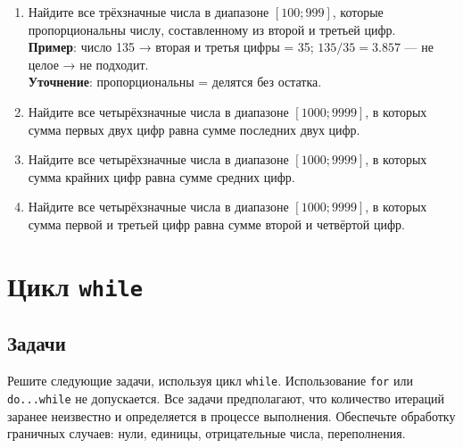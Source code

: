 \documentclass[12pt]{article}
\begin{document}
\begin{enumerate}
    \item Найдите все трёхзначные числа в диапазоне $[100; 999]$, которые пропорциональны числу, составленному из второй и третьей цифр. \\
    \textbf{Пример}: число 135 → вторая и третья цифры = 35; $135 / 35 = 3.857$ — не целое → не подходит. \\
    \textbf{Уточнение}: пропорциональны = делятся без остатка.

    \item Найдите все четырёхзначные числа в диапазоне $[1000; 9999]$, в которых сумма первых двух цифр равна сумме последних двух цифр.

    \item Найдите все четырёхзначные числа в диапазоне $[1000; 9999]$, в которых сумма крайних цифр равна сумме средних цифр.

    \item Найдите все четырёхзначные числа в диапазоне $[1000; 9999]$, в которых сумма первой и третьей цифр равна сумме второй и четвёртой цифр.
\end{enumerate}

\section{Цикл \texttt{while}}

\subsection*{Задачи}

Решите следующие задачи, используя цикл \texttt{while}. Использование \texttt{for} или \texttt{do...while} не допускается. Все задачи предполагают, что количество итераций заранее неизвестно и определяется в процессе выполнения. Обеспечьте обработку граничных случаев: нули, единицы, отрицательные числа, переполнения.
\end{document}
